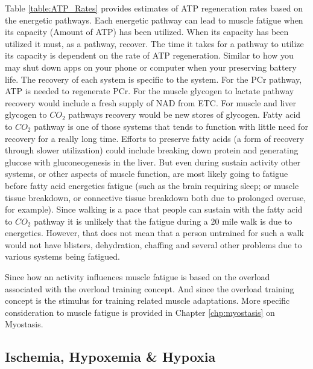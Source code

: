 Table \ref{table:ATP_Rates} provides estimates of ATP regeneration rates based on the energetic pathways. Each energetic pathway can lead to muscle fatigue when its capacity (Amount of ATP) has been utilized. When its capacity has been utilized it must, as a pathway, recover. The time it takes for a pathway to utilize its capacity is dependent on the rate of ATP regeneration. Similar to how you may shut down apps on your phone or computer when your preserving battery life. The recovery of each system is specific to the system. For the PCr pathway, ATP is needed to regenerate PCr. For the muscle glycogen to lactate pathway recovery would include a fresh supply of NAD from ETC. For muscle and liver glycogen to $CO_2$ pathways recovery would be new stores of glycogen. Fatty acid to $CO_2$ pathway is one of those systems that tends to function with little need for recovery for a really long time. Efforts to preserve fatty acids (a form of recovery through slower utilization) could include breaking down protein and generating glucose with gluconeogenesis in the liver. But even during sustain activity other systems, or other aspects of muscle function, are most likely going to fatigue before fatty acid energetics fatigue (such as the brain requiring sleep; or muscle tissue breakdown, or connective tissue breakdown both due to prolonged overuse, for example). Since walking is a pace that people can sustain with the fatty acid to $CO_2$ pathway it is unlikely that the fatigue during a 20 mile walk is due to energetics. However, that does not mean that a person untrained for such a walk would not have blisters, dehydration, chaffing and several other problems due to various systems being fatigued.

Since how an activity influences muscle fatigue is based on the overload associated with the overload training concept. And since the overload training concept is the stimulus for training related muscle adaptations. More specific consideration to muscle fatigue is provided in Chapter \ref{chp:myostasis} on Myostasis.

\subsection{Ischemia, Hypoxemia \& Hypoxia}


